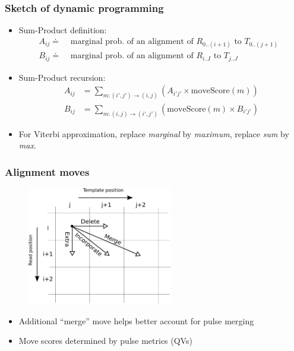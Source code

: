 \documentclass[serif,11pt]{beamer}
\begin{document}
\begin{frame}
\frametitle{Sketch of dynamic programming}
\label{sec-6-7}

\begin{itemize}
\item Sum-Product definition:
     \begin{align*}
     A_{ij} \doteq&
     \text{ marginal prob. of an alignment of $R_{0..(i+1)}$ to $T_{0..(j+1)}$ } \\
     B_{ij} \doteq&
     \text{ marginal prob. of an alignment of $R_{i..I}$ to $T_{j..J}$ }
     \end{align*}
\item Sum-Product recursion:
     \begin{align*}
     A_{ij} &= \sum_{m: (i',j') \to (i, j)}   (A_{i'j'} \times \mathrm{moveScore}(m)) \\
     B_{ij} &= \sum_{m: (i, j)  \to (i', j')} (\mathrm{moveScore}(m) \times B_{i'j'})
     \end{align*}
\item For Viterbi approximation, replace \emph{marginal} by \emph{maximum}, replace \emph{sum}
     by \emph{max}.
\end{itemize}
\end{frame}
\begin{frame}
\frametitle{Alignment moves}
\label{sec-6-8}

   \begin{figure}
   \centering
   \includegraphics[width=2.5in]{img/moves}
   \end{figure}

\begin{itemize}
\item Additional ``merge'' move helps better account for pulse merging
\item Move scores determined by pulse metrics (QVs)
\end{itemize}
\end{frame}
\end{document}
